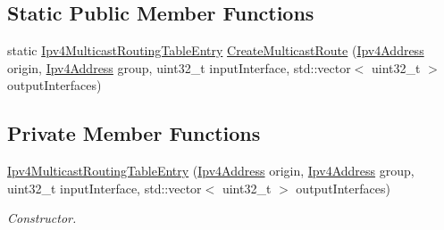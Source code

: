 \subsection*{Static Public Member Functions}
\begin{DoxyCompactItemize}
\item 
static \hyperlink{classns3_1_1Ipv4MulticastRoutingTableEntry}{Ipv4\+Multicast\+Routing\+Table\+Entry} \hyperlink{classns3_1_1Ipv4MulticastRoutingTableEntry_abe362dd84c42e6a93a7b793f88e8d3fd}{Create\+Multicast\+Route} (\hyperlink{classns3_1_1Ipv4Address}{Ipv4\+Address} origin, \hyperlink{classns3_1_1Ipv4Address}{Ipv4\+Address} group, uint32\+\_\+t input\+Interface, std\+::vector$<$ uint32\+\_\+t $>$ output\+Interfaces)
\end{DoxyCompactItemize}
\subsection*{Private Member Functions}
\begin{DoxyCompactItemize}
\item 
\hyperlink{classns3_1_1Ipv4MulticastRoutingTableEntry_a0ad9b13a8134a2538cf83de4717a0324}{Ipv4\+Multicast\+Routing\+Table\+Entry} (\hyperlink{classns3_1_1Ipv4Address}{Ipv4\+Address} origin, \hyperlink{classns3_1_1Ipv4Address}{Ipv4\+Address} group, uint32\+\_\+t input\+Interface, std\+::vector$<$ uint32\+\_\+t $>$ output\+Interfaces)
\begin{DoxyCompactList}\small\item\em Constructor. \end{DoxyCompactList}\end{DoxyCompactItemize}
